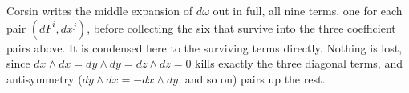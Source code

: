 \begin{ainote}
Corsin writes the middle expansion of $d\omega$ out in full, all nine terms, one for each pair
$(dF^i,dx^j)$, before collecting the six that survive into the three coefficient pairs above. It
is condensed here to the surviving terms directly. Nothing is lost, since $dx\wedge
dx=dy\wedge dy=dz\wedge dz=0$ kills exactly the three diagonal terms, and antisymmetry
($dy\wedge dx=-dx\wedge dy$, and so on) pairs up the rest.
\end{ainote}

\begin{center}
\end{center}


